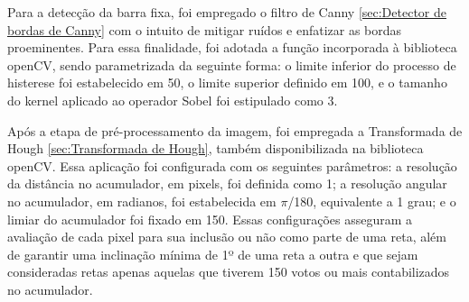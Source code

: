 Para a detecção da barra fixa, foi empregado o filtro de Canny \ref{sec:Detector de bordas de Canny} com o intuito de mitigar ruídos e enfatizar as bordas proeminentes. Para essa finalidade, foi adotada a função incorporada à biblioteca \ac{openCV}, sendo parametrizada da seguinte forma: o limite inferior do processo de histerese foi estabelecido em 50, o limite superior definido em 100, e o tamanho do kernel aplicado ao operador Sobel foi estipulado como 3. 

Após a etapa de pré-processamento da imagem, foi empregada a Transformada de Hough \ref{sec:Transformada de Hough}, também disponibilizada na biblioteca \ac{openCV}. Essa aplicação foi configurada com os seguintes parâmetros: a resolução da distância no acumulador, em pixels, foi definida como 1; a resolução angular no acumulador, em radianos, foi estabelecida em $\pi$/180, equivalente a 1 grau; e o limiar do acumulador foi fixado em 150. Essas configurações asseguram a avaliação de cada pixel para sua inclusão ou não como parte de uma reta, além de garantir uma inclinação mínima de 1º de uma reta a outra e que sejam consideradas retas apenas aquelas que tiverem 150 votos ou mais contabilizados no acumulador.


